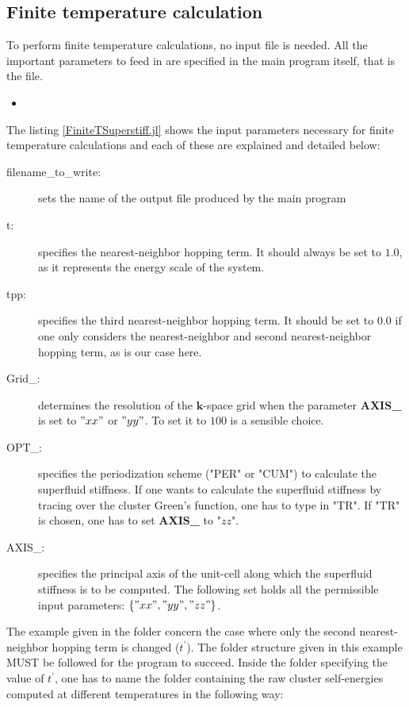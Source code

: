 \documentclass{article}
\newcommand{\juliascriptFT}[4]{
\begin{itemize}
\item[]
\end{itemize}
}
\begin{document}
\subsection{Finite temperature calculation}
\label{finite_T_calculation}

To perform finite temperature calculations, no  input file is needed. All the important parameters to feed in are specified in the main program itself, that is the  file.

\juliascriptFT{FiniteTSuperstiff.jl}{Input parameters in FiniteTSuperstiff.jl}{1}{15}

The listing \ref{FiniteTSuperstiff.jl} shows the input parameters necessary for finite temperature calculations and each of these are explained and detailed below:

\begin{description}
\item[filename\_to\_write:] sets the name of the output file produced by the main program 
%
\item[t:] specifies the nearest-neighbor hopping term. It should always be set to $1.0$, as it represents the energy scale of the system.
%
\item[tpp:] specifies the third nearest-neighbor hopping term. It should be set to $0.0$ if one only considers the nearest-neighbor and second nearest-neighbor hopping term, as is our case here.
%
\item[Grid\_:] determines the resolution of the $\mathbf{k}$-space grid when the parameter \textbf{AXIS\_} is set to $"xx"$ or $"yy"$. To set it to $100$ is a sensible choice.
%
\item[OPT\_:] specifies the periodization scheme ("PER" or "CUM") to calculate the superfluid stiffness. If one wants to calculate the superfluid stiffness by tracing over the cluster Green's function, one has to type in "TR". If "TR" is chosen, one has to set \textbf{AXIS\_} to "$zz$".
%
\item[AXIS\_:] specifies the principal axis of the unit-cell along which the superfluid stiffness is to be computed. The following set holds all the permissible input parameters: $\{"xx", "yy", "zz"\}$.
\end{description}

The example given in the folder  concern the case where only the second nearest-neighbor hopping term is changed ($t^{\prime}$). The folder structure given in this example MUST be followed for the program to succeed. Inside the folder specifying the value of $t^{\prime}$, one has to name the folder containing the raw cluster self-energies computed at different temperatures in the following way:
\end{document}
